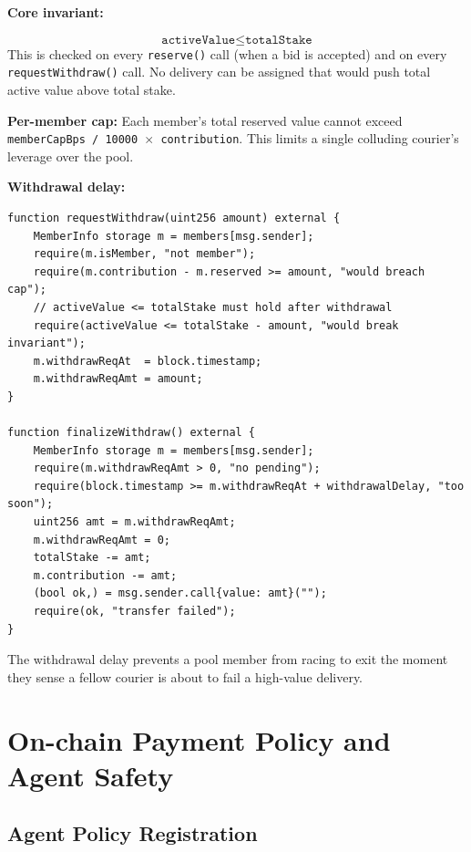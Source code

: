 \documentclass[12pt,a4paper]{article}
\begin{document}
\textbf{Core invariant:}

\begin{invariantbox}
\[
\texttt{activeValue} \leq \texttt{totalStake}
\]
This is checked on every \texttt{reserve()} call (when a bid is accepted) and on every \texttt{requestWithdraw()} call. No delivery can be assigned that would push total active value above total stake.
\end{invariantbox}

\textbf{Per-member cap:}
Each member's total reserved value cannot exceed \texttt{memberCapBps / 10000 $\times$ contribution}. This limits a single colluding courier's leverage over the pool.

\textbf{Withdrawal delay:}
\begin{lstlisting}[language=Solidity, caption=Withdrawal delay in StakingPool.sol (simplified)]
function requestWithdraw(uint256 amount) external {
    MemberInfo storage m = members[msg.sender];
    require(m.isMember, "not member");
    require(m.contribution - m.reserved >= amount, "would breach cap");
    // activeValue <= totalStake must hold after withdrawal
    require(activeValue <= totalStake - amount, "would break invariant");
    m.withdrawReqAt  = block.timestamp;
    m.withdrawReqAmt = amount;
}

function finalizeWithdraw() external {
    MemberInfo storage m = members[msg.sender];
    require(m.withdrawReqAmt > 0, "no pending");
    require(block.timestamp >= m.withdrawReqAt + withdrawalDelay, "too soon");
    uint256 amt = m.withdrawReqAmt;
    m.withdrawReqAmt = 0;
    totalStake -= amt;
    m.contribution -= amt;
    (bool ok,) = msg.sender.call{value: amt}("");
    require(ok, "transfer failed");
}
\end{lstlisting}

The withdrawal delay prevents a pool member from racing to exit the moment they sense a fellow courier is about to fail a high-value delivery.

\section{On-chain Payment Policy and Agent Safety}
\label{sec:policy}

\subsection{Agent Policy Registration}
\end{document}
